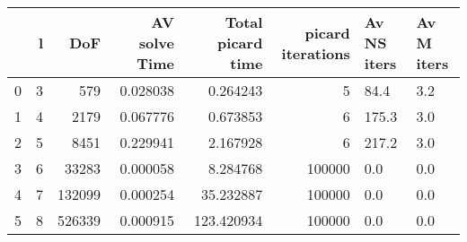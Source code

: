 \begin{tabular}{lrrrrrll}
\toprule
{} &  l &     DoF &  AV solve Time &  Total picard time &  picard iterations & Av NS iters & Av M iters \\
\midrule
0 &  3 &     579 &       0.028038 &           0.264243 &                  5 &        84.4 &        3.2 \\
1 &  4 &    2179 &       0.067776 &           0.673853 &                  6 &       175.3 &        3.0 \\
2 &  5 &    8451 &       0.229941 &           2.167928 &                  6 &       217.2 &        3.0 \\
3 &  6 &   33283 &       0.000058 &           8.284768 &             100000 &         0.0 &        0.0 \\
4 &  7 &  132099 &       0.000254 &          35.232887 &             100000 &         0.0 &        0.0 \\
5 &  8 &  526339 &       0.000915 &         123.420934 &             100000 &         0.0 &        0.0 \\
\bottomrule
\end{tabular}
